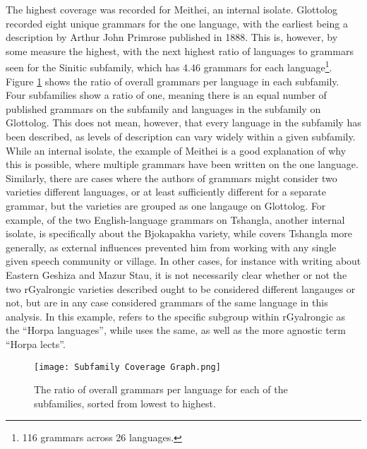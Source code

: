 The highest coverage was recorded for Meithei, an internal isolate. Glottolog recorded eight unique grammars for the one language, with the earliest being a description by Arthur John Primrose published in 1888\nocite{Primrose1888}. This is, however, by some measure the highest, with the next highest ratio of languages to grammars seen for the Sinitic subfamily, which has 4.46 grammars for each language\footnote{116 grammars across 26 languages.}. Figure \ref{f:Description:SubfamilyCoverageGraph} shows the ratio of overall grammars per language in each subfamily. Four subfamilies show a ratio of one, meaning there is an equal number of published grammars on the subfamily and languages in the subfamily on Glottolog. This does not mean, however, that every language in the subfamily has been described, as levels of description can vary widely within a given subfamily. While an internal isolate, the example of Meithei is a good explanation of why this is possible, where multiple grammars have been written on the one language. Similarly, there are cases where the authors of grammars might consider two varieties different languages, or at least sufficiently different for a separate grammar, but the varieties are grouped as one langauge on Glottolog. For example, of the two English-language grammars on Tshangla, another internal isolate,  is specifically about the Bjokapakha variety, while  covers Tshangla more generally, as external influences prevented him from working with any single given speech community or village. In other cases, for instance with  writing about Eastern Geshiza and Mazur Stau, it is not necessarily clear whether or not the two rGyalrongic varieties described ought to be considered different langauges or not, but are in any case considered grammars of the same language in this analysis. In this example,  refers to the specific subgroup within rGyalrongic as the ``Horpa languages'', while  uses the same, as well as the more agnostic term ``Horpa lects''.

\begin{figure}
        \texttt{[image: Subfamily Coverage Graph.png]}
        \caption{The ratio of overall grammars per language for each of the subfamilies, sorted from lowest to highest.}\label{f:Description:SubfamilyCoverageGraph}
\end{figure}

